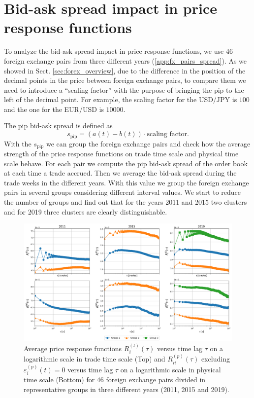 \section{Bid-ask spread impact in price response functions}
\label{sec:spread_impact}

To analyze the bid-ask spread impact in price response functions, we use 46
foreign exchange pairs from three different years (\ref{app:fx_pairs_spread}).
As we showed in Sect. \ref{sec:forex_overview}, due to the difference in the
position of the decimal points in the price between foreign exchange pairs, to
compare them we need to introduce a ``scaling factor'' with the purpose of
bringing the pip to the left of the decimal point. For example, the scaling
factor for the USD/JPY is $100$ and the one for the EUR/USD is $10000$.

The pip bid-ask spread is defined as \cite{micro_eff}
\begin{equation}
    s_{\textrm{pip}} = \left(a\left(t\right) - b\left(t\right)\right) \cdot
    \textrm{scaling factor}.
\end{equation}
With the $s_{\textrm{pip}}$ we can group the foreign exchange pairs and check
how the average strength of the price response functions on trade time scale
and physical time scale behave. For each pair we compute the pip bid-ask spread
of the order book at each time a trade accrued. Then we average the bid-ask
spread during the trade weeks in the different years. With this value we group
the foreign exchange pairs in several groups considering different interval
values. We start to reduce the number of groups and find out that for the years
2011 and 2015 two clusters and for 2019 three clusters are clearly
distinguishable.

\begin{figure}[htbp]
    \centering
    \includegraphics[width=\textwidth]{figures/05_spread_impact.png}
    \caption{Average price response functions
             $R^{\left(t\right)}_{i}\left(\tau\right)$ versus time lag $\tau$
             on a logarithmic scale in trade time scale (Top) and
             $R^{\left(p\right)}_{ii}\left(\tau\right)$ excluding
             $\varepsilon^{\left(p\right)}_{i}\left(t\right) = 0$ versus time
             lag $\tau$ on a logarithmic scale in physical time scale (Bottom)
             for 46 foreign exchange pairs divided in representative groups in
             three different years (2011, 2015 and 2019).}
    \label{fig:spread_impact}
\end{figure}

